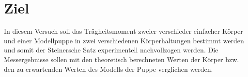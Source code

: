 \section{Ziel}
In diesem Versuch soll das Trägheitsmoment zweier verschieder einfacher Körper
und einer Modellpuppe in zwei verschiedenen Körperhaltungen bestimmt werden und
somit der Steinersche Satz experimentell nachvollzogen werden.
Die Messergebnisse sollen mit den theoretisch berechneten Werten der Körper bzw.
den zu erwartenden Werten des Modells der Puppe verglichen werden.
\label{sec:Ziel}
